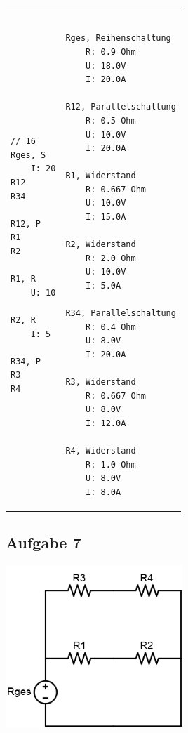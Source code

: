 \documentclass[a4paper,10pt,ngerman]{scrartcl}
\begin{document}
\begin{tabular}{p{}p{}}
\raggedright
\begin{verbatim}

// 16
Rges, S
    I: 20
R12
R34

R12, P
R1
R2

R1, R
    U: 10

R2, R
    I: 5

R34, P
R3
R4

\end{verbatim}   &
\raggedleft
\begin{verbatim}

Rges, Reihenschaltung
    R: 0.9 Ohm
    U: 18.0V
    I: 20.0A

R12, Parallelschaltung
    R: 0.5 Ohm
    U: 10.0V
    I: 20.0A

R1, Widerstand
    R: 0.667 Ohm
    U: 10.0V
    I: 15.0A

R2, Widerstand
    R: 2.0 Ohm
    U: 10.0V
    I: 5.0A

R34, Parallelschaltung
    R: 0.4 Ohm
    U: 8.0V
    I: 20.0A

R3, Widerstand
    R: 0.667 Ohm
    U: 8.0V
    I: 12.0A

R4, Widerstand
    R: 1.0 Ohm
    U: 8.0V
    I: 8.0A

\end{verbatim}
\end{tabular}

\subsection{Aufgabe 7}

\includegraphics[width=0.5\textwidth]{circuit8.png}
\end{document}

